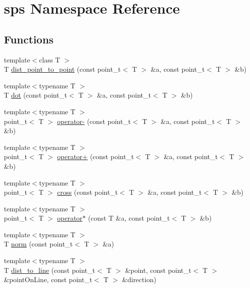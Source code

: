 \hypertarget{namespacesps}{\section{sps Namespace Reference}
\label{namespacesps}
}
\subsection*{Functions}
\begin{DoxyCompactItemize}
\item 
{\footnotesize template$<$class T $>$ }\\T \hyperlink{namespacesps_a5ec8f80252d9d984138f014c822d27d0}{dist\+\_\+point\+\_\+to\+\_\+point} (const point\+\_\+t$<$ T $>$ \&a, const point\+\_\+t$<$ T $>$ \&b)
\item 
{\footnotesize template$<$typename T $>$ }\\T \hyperlink{namespacesps_a49b7bc999932466978a16485e1c6a98b}{dot} (const point\+\_\+t$<$ T $>$ \&a, const point\+\_\+t$<$ T $>$ \&b)
\item 
{\footnotesize template$<$typename T $>$ }\\point\+\_\+t$<$ T $>$ \hyperlink{namespacesps_a634cb0a93cc6f57c45c79f7df04c8752}{operator-\/} (const point\+\_\+t$<$ T $>$ \&a, const point\+\_\+t$<$ T $>$ \&b)
\item 
{\footnotesize template$<$typename T $>$ }\\point\+\_\+t$<$ T $>$ \hyperlink{namespacesps_abcd3fabeb60a10d9ad05fc027c789e9e}{operator+} (const point\+\_\+t$<$ T $>$ \&a, const point\+\_\+t$<$ T $>$ \&b)
\item 
{\footnotesize template$<$typename T $>$ }\\point\+\_\+t$<$ T $>$ \hyperlink{namespacesps_a04c7b1f1585fda60325b43c35937ee96}{cross} (const point\+\_\+t$<$ T $>$ \&a, const point\+\_\+t$<$ T $>$ \&b)
\item 
{\footnotesize template$<$typename T $>$ }\\point\+\_\+t$<$ T $>$ \hyperlink{namespacesps_a22175b6c56edce28e060aaddb0443215}{operator$\ast$} (const T \&a, const point\+\_\+t$<$ T $>$ \&b)
\item 
{\footnotesize template$<$typename T $>$ }\\T \hyperlink{namespacesps_ac8e58e03b1ed250e4dd83774401fb670}{norm} (const point\+\_\+t$<$ T $>$ \&a)
\item 
{\footnotesize template$<$typename T $>$ }\\T \hyperlink{namespacesps_a55c6fe1c1fdf3c5a3e7b354dae205840}{dist\+\_\+to\+\_\+line} (const point\+\_\+t$<$ T $>$ \&point, const point\+\_\+t$<$ T $>$ \&point\+On\+Line, const point\+\_\+t$<$ T $>$ \&direction)

\end{DoxyCompactItemize}
